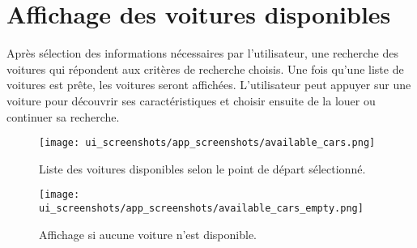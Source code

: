 \section{Affichage des voitures disponibles}
Après sélection des informations nécessaires par l'utilisateur, une recherche des voitures qui répondent aux critères de recherche choisis. Une fois qu'une liste de voitures est prête, les voitures seront affichées. L'utilisateur peut appuyer sur une voiture pour découvrir ses caractéristiques et choisir ensuite de la louer ou continuer sa recherche.
\begin{multicols}{2}
    \begin{figure}[H]
        \centering
        \texttt{[image: ui\_screenshots/app\_screenshots/available\_cars.png]}
        \captionsetup{justification=centering}
        \caption{Liste des voitures disponibles selon le point de départ sélectionné.}
        \label{fig:app_available_cars}
    \end{figure}
    \begin{figure}[H]
        \centering
        \texttt{[image: ui\_screenshots/app\_screenshots/available\_cars\_empty.png]}
        \captionsetup{justification=centering}
        \caption{Affichage si aucune voiture n'est disponible.}
        \label{fig:app_available_cars_empty}
    \end{figure}
\end{multicols}

